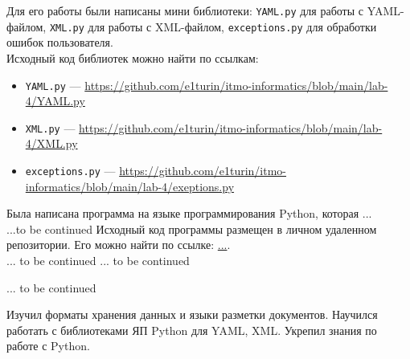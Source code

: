 Для его работы были написаны мини библиотеки: \texttt{YAML.py} для работы с YAML-файлом, \texttt{XML.py} для работы с XML-файлом, \texttt{exсeptions.py} для обработки ошибок пользователя.\\
Исходный код библиотек можно найти по ссылкам: 
\begin{itemize}
    \item \texttt{YAML.py} ---  \url{https://github.com/e1turin/itmo-informatics/blob/main/lab-4/YAML.py}
    
    \item \texttt{XML.py} --- \url{https://github.com/e1turin/itmo-informatics/blob/main/lab-4/XML.py}
    
    \item \texttt{exсeptions.py} --- \url{https://github.com/e1turin/itmo-informatics/blob/main/lab-4/exeptions.py}
\end{itemize}


Была написана программа на языке программирования Python, которая ...\\
...to be continued
Исходный код программы размещен в личном удаленном репозитории. Его можно найти по ссылке: \url{...}.\\ 

... to be continued
... to be continued

... to be continued

Изучил форматы хранения данных и языки разметки документов. Научился работать с библиотеками ЯП Python для YAML, XML. Укрепил знания по работе с Python.\\
\newpage





